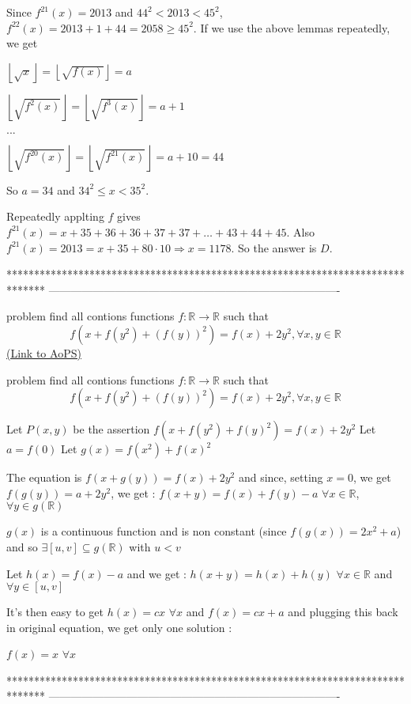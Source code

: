 \begin{solution}
Since $f^{21}(x) = 2013$ and $44^2<2013<45^2$, $f^{22}(x) = 2013+1+44 = 2058 \geq 45^2$.
If we use the above lemmas repeatedly, we get 

$\left \lfloor \sqrt {x} \right \rfloor  = \left \lfloor \sqrt {f(x)} \right \rfloor  = a$

$\left \lfloor \sqrt {f^2(x)} \right \rfloor  =  \left \lfloor \sqrt {f^{3}(x)} \right \rfloor  = a+1$

$...$

$\left \lfloor \sqrt {f^{20}(x)} \right \rfloor  =  \left \lfloor \sqrt {f^{21}(x)} \right \rfloor  = a+10 = 44$

So $a=34$ and $34^2\leq x < 35^2$.

Repeatedly applting $f$ gives $f^{21}(x) = x + 35 + 36 + 36 + 37 + 37 + \dots + 43 + 44 + 45 $.
Also $f^{21}(x) = 2013 = x + 35 + 80\cdot 10  \Rightarrow x = 1178$.
So the answer is $\boxed{D}$.
\end{solution}
*******************************************************************************
-------------------------------------------------------------------------------

\begin{problem}
	problem find all  contions functions $f:\mathbb{R}\to\mathbb{R}$ such that 
\[f(x+f(y^2)+(f(y))^2)=f(x)+2y^2,\forall x,y\in\mathbb{R}\]
	\flushright \href{https://artofproblemsolving.com/community/c6h530569}{(Link to AoPS)}
\end{problem}



\begin{solution}
	\begin{tcolorbox}problem find all  contions functions $f:\mathbb{R}\to\mathbb{R}$ such that 
\[f(x+f(y^2)+(f(y))^2)=f(x)+2y^2,\forall x,y\in\mathbb{R}\]\end{tcolorbox}
Let $P(x,y)$ be the assertion $f(x+f(y^2)+f(y)^2)=f(x)+2y^2$
Let $a=f(0)$
Let $g(x)=f(x^2)+f(x)^2$

The equation is $f(x+g(y))=f(x)+2y^2$ and since, setting $x=0$, we get $f(g(y))=a+2y^2$, we get  :
$f(x+y)=f(x)+f(y)-a$ $\forall x\in\mathbb R$, $\forall y\in g(\mathbb R)$

$g(x)$ is a continuous function and is non constant (since $f(g(x))=2x^2+a$) and so $\exists [u,v]\subseteq g(\mathbb R)$ with $u<v$

Let $h(x)=f(x)-a$ and we get :
$h(x+y)=h(x)+h(y)$ $\forall x\in\mathbb R$ and $\forall y\in[u,v]$

It's then easy to get $h(x)=cx$ $\forall x$ and $f(x)=cx+a$ and plugging this back in original equation, we get only one solution :

$\boxed{f(x)=x}$ $\forall x$
\end{solution}
*******************************************************************************
-------------------------------------------------------------------------------

